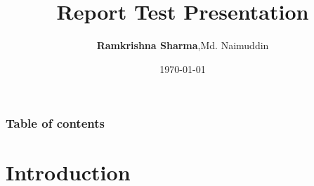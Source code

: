 \documentclass[slidestop,compress,mathserif]{beamer}
\title[Test presentation]{Report Test Presentation}
\author[Ramkrishna Sharma]{{\bf Ramkrishna Sharma},Md. Naimuddin}
\institute[DU]{University of Delhi, India}
\date{\today}
\begin{document}
\renewcommand{\inserttotalframenumber}{\pageref{lastslide}}
\begin{frame}
\titlepage
\end{frame}

\begin{frame}\frametitle{Table of contents}\tableofcontents
\end{frame}
\section{Introduction}




\end{document}
